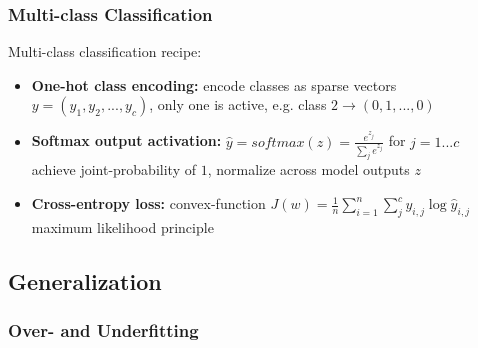 \documentclass[aspectratio=169]{beamer}
\begin{document}
\begin{frame}
\frametitle{Multi-class Classification}

Multi-class classification recipe:
\medskip
\begin{itemize}
    \item \textbf{One-hot class encoding:} encode classes as sparse vectors \\
    $y=(y_1, y_2, ..., y_c)$, only one is active, e.g. class $2\rightarrow (0, 1, ..., 0)$
    \item \textbf{Softmax output activation:} $\hat{y}=softmax(z)=\frac{e^{z_{j}}}{\sum_{j}e^{z_{j}}}$ for $j=1...c$\\
    achieve joint-probability of $1$, normalize across model outputs $z$
    \item \textbf{Cross-entropy loss:} convex-function $J(w)=\frac{1}{n}\sum_{i=1}^{n}\sum_{j}^{c}y_{i,j}\log\hat{y}_{i,j}$\\
    maximum likelihood principle
\end{itemize}
\end{frame}

\subsection{Generalization}
\label{subsec:generalization}

\begin{frame}
\frametitle{Over- and Underfitting}
\end{frame}
\end{document}
